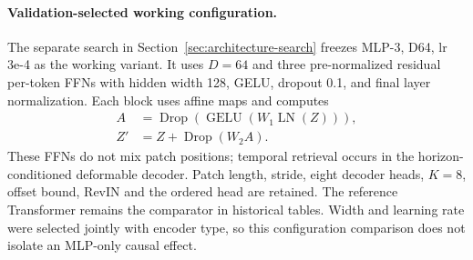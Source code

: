 \paragraph{Validation-selected working configuration.} The separate search in Section~\ref{sec:architecture-search} freezes MLP-3, D64, lr 3e-4 as the working variant. It uses $D=64$ and three pre-normalized residual per-token FFNs with hidden width 128, GELU, dropout 0.1, and final layer normalization. Each block uses affine maps and computes \begin{equation}\begin{aligned}A&=\operatorname{Drop}(\operatorname{GELU}(W_1\operatorname{LN}(Z))),\\Z'&=Z+\operatorname{Drop}(W_2 A).\end{aligned}\end{equation} These FFNs do not mix patch positions; temporal retrieval occurs in the horizon-conditioned deformable decoder. Patch length, stride, eight decoder heads, $K=8$, offset bound, RevIN and the ordered head are retained. The reference Transformer remains the comparator in historical tables. Width and learning rate were selected jointly with encoder type, so this configuration comparison does not isolate an MLP-only causal effect.

